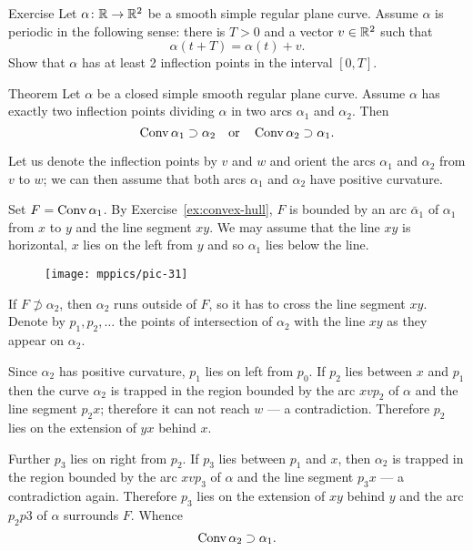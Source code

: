 \begin{thm}{Exercise}
Let $\alpha\colon\mathbb{R}\to\mathbb{R}^2$ be a smooth simple regular plane curve.
Assume $\alpha$ is periodic in the following sense:
there is $T>0$ and a vector $v\in\mathbb{R}^2$ such that 
\[\alpha(t+T)=\alpha(t)+v.\]
Show that $\alpha$ has at least 2 inflection points in the interval $[0,T]$.

\end{thm}

\begin{thm}{Theorem} 
Let $\alpha$ be a closed simple smooth regular plane curve.
Assume $\alpha$ has exactly two inflection points dividing $\alpha$ in two arcs $\alpha_1$ and $\alpha_2$.
Then 
\[\mathop{\rm Conv}\nolimits \alpha_1\supset \alpha_2
\quad\text{or}\quad
\mathop{\rm Conv}\nolimits \alpha_2\supset \alpha_1.\]

\end{thm}

Let us denote the inflection points by $v$ and $w$
and orient the arcs $\alpha_1$ and $\alpha_2$ from $v$ to $w$; we can then assume that both arcs $\alpha_1$ and $\alpha_2$ have positive curvature.

Set $F=\mathop{\rm Conv}\nolimits \alpha_1$.
By Exercise~\ref{ex:convex-hull}, $F$ is bounded by an arc $\bar\alpha_1$ of $\alpha_1$ from $x$ to $y$ 
and the line segment $xy$.
We may assume that the line $xy$ is horizontal, $x$ lies on the left from $y$ and so $\alpha_1$ lies below the line.

\begin{figure}[h!]
\vskip-0mm
\centering
\texttt{[image: mppics/pic-31]}
\vskip0mm
\end{figure}

If $F\not\supset \alpha_2$, then $\alpha_2$ runs outside of $F$, so it has to cross the line segment $xy$.
Denote by $p_1, p_2,\dots$ the points of intersection of $\alpha_2$ with the line $xy$ as they appear on $\alpha_2$.

Since $\alpha_2$ has positive curvature, $p_1$ lies on left from $p_0$.
If $p_2$ lies between $x$ and $p_1$ then the curve $\alpha_2$ is trapped in the region bounded by the arc $xvp_2$ of $\alpha$ and the line segment $p_2x$;
therefore it can not reach $w$ --- a contradiction.
Therefore $p_2$ lies on the extension of $yx$ behind $x$.

Further $p_3$ lies on right from $p_2$. 
If $p_3$ lies between $p_1$ and $x$, then $\alpha_2$ is trapped in the region bounded by the arc $xvp_3$ of $\alpha$ and the line segment $p_3x$ --- a contradiction again.
Therefore $p_3$ lies on the extension of $xy$ behind $y$ and the arc $p_2p3$ of $\alpha$ surrounds $F$.
Whence
\[\mathop{\rm Conv}\nolimits \alpha_2\supset \alpha_1.\]
\qedsf


